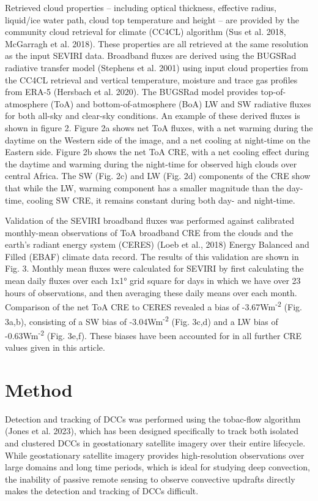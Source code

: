 Retrieved cloud properties -- including optical thickness, effective
radius, liquid/ice water path, cloud top temperature and height -- are
provided by the community cloud retrieval for climate (CC4CL) algorithm
(Sus et al. 2018, McGarragh et al. 2018). These properties are all
retrieved at the same resolution as the input SEVIRI data. Broadband
fluxes are derived using the BUGSRad radiative transfer model (Stephens
et al. 2001) using input cloud properties from the CC4CL retrieval and
vertical temperature, moisture and trace gas profiles from ERA-5
(Hersbach et al. 2020). The BUGSRad model provides top-of-atmosphere
(ToA) and bottom-of-atmosphere (BoA) LW and SW radiative fluxes for both
all-sky and clear-sky conditions. An example of these derived fluxes is
shown in figure 2. Figure 2a shows net ToA fluxes, with a net warming
during the daytime on the Western side of the image, and a net cooling
at night-time on the Eastern side. Figure 2b shows the net ToA CRE, with
a net cooling effect during the daytime and warming during the
night-time for observed high clouds over central Africa. The SW (Fig.
2c) and LW (Fig. 2d) components of the CRE show that while the LW,
warming component has a smaller magnitude than the day-time, cooling SW
CRE, it remains constant during both day- and night-time.

Validation of the SEVIRI broadband fluxes was performed against
calibrated monthly-mean observations of ToA broadband CRE from the
clouds and the earth's radiant energy system (CERES) (Loeb et al., 2018)
Energy Balanced and Filled (EBAF) climate data record. The results of
this validation are shown in Fig. 3. Monthly mean fluxes were calculated
for SEVIRI by first calculating the mean daily fluxes over each 1x1°
grid square for days in which we have over 23 hours of observations, and
then averaging these daily means over each month. Comparison of the net
ToA CRE to CERES revealed a bias of -3.67Wm\textsuperscript{-2} (Fig.
3a,b), consisting of a SW bias of -3.04Wm\textsuperscript{-2} (Fig.
3c,d) and a LW bias of -0.63Wm\textsuperscript{-2} (Fig. 3e,f). These
biases have been accounted for in all further CRE values given in this
article.

\section{Method}

Detection and tracking of DCCs was performed using the tobac-flow
algorithm (Jones et al. 2023), which has been designed specifically to
track both isolated and clustered DCCs in geostationary satellite
imagery over their entire lifecycle. While geostationary satellite
imagery provides high-resolution observations over large domains and
long time periods, which is ideal for studying deep convection, the
inability of passive remote sensing to observe convective updrafts
directly makes the detection and tracking of DCCs difficult.

